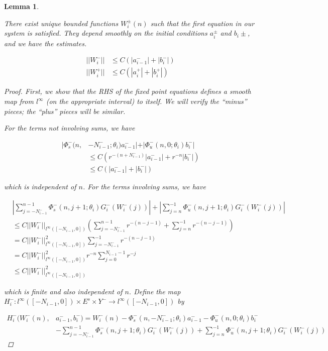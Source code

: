 \documentclass[12pt]{article}
\newtheorem{lemma}{Lemma}
\begin{document}
\begin{lemma}\label{inv1}

There exist unique bounded functions $W_i^\pm(n)$ such that the first equation in our system is satisfied. They depend smoothly on the initial conditions $a_i^\pm$ and $b_i\pm$, and we have the estimates.

\begin{align*}
||W_i^-|| &\leq C (|a_{i-1}^-| + |b_i^-|) \\
||W_i^+|| &\leq C (|a_i^+| + |b_i^+| )
\end{align*}

\begin{proof}
First, we show that the RHS of the fixed point equations defines a smooth map from $l^\infty$ (on the appropriate interval) to itself. We will verify the ``minus'' pieces; the ``plus'' pieces will be similar.

For the terms not involving sums, we have

\begin{align*}
|\Phi_s^-(n, &-N_{i-1}^-; \theta_i) a_{i-1}^-| + |\Phi_u^-(n, 0; \theta_i) b_i^-| \\
&\leq C ( r^{-(n + N_{i-1}^-)} |a_{i-1}^-| +  r^{-n}|b_i^-|) \\
&\leq C ( |a_{i-1}^-| + |b_i^-|) 
\end{align*}

which is independent of $n$. For the terms involving sums, we have

\begin{align*}
&\left| \sum_{j = -N_{i-1}^-}^{n-1} \Phi_s^-(n, j+1; \theta_i) G_i^-(W_i^-(j))\right| + \left|\sum_{j = n}^{-1} \Phi_u^-(n, j+1; \theta_i) G_i^-(W_i^-(j))\right| \\
&\leq C ||W_i^-||_{l^\infty([-N_{i-1}, 0])} \left( \sum_{j = -N_{i-1}^-}^{n-1} r^{-(n - j - 1)} + \sum_{j = n}^{-1} r^{-(n - j - 1)} \right) \\
&= C ||W_i^-||_{l^\infty([-N_{i-1}, 0])}^2 \sum_{j = -N_{i-1}^-}^{-1} r^{-(n - j - 1)} \\
&= C ||W_i^-||_{l^\infty([-N_{i-1}, 0])}^2 r^{-n} \sum_{j = 0}^{N_{i-1} - 1} r^{-j} \\
&\leq C ||W_i^-||_{l^\infty([-N_{i-1}, 0])}^2 
\end{align*}

which is finite and also independent of $n$. Define the map $H_i^-: l^\infty([-N_{i-1}, 0]) \times E^s \times Y^- \rightarrow l^\infty([-N_{i-1}, 0])$ by

\begin{align*}
H_i^-(W_i^-(n), &a_{i-1}^-, b_i^-) = W_i^-(n) - \Phi_s^-(n, -N_{i-1}^-; \theta_i) a_{i-1}^- - \Phi_u^-(n, 0; \theta_i) b_i^-  \\
&- \sum_{j = -N_{i-1}^-}^{n-1} \Phi_s^-(n, j+1; \theta_i) G_i^-(W_i^-(j)) + \sum_{j = n}^{-1} \Phi_u^-(n, j+1; \theta_i) G_i^-(W_i^-(j)) 
\end{align*}


\end{proof}
\end{lemma}
\end{document}
